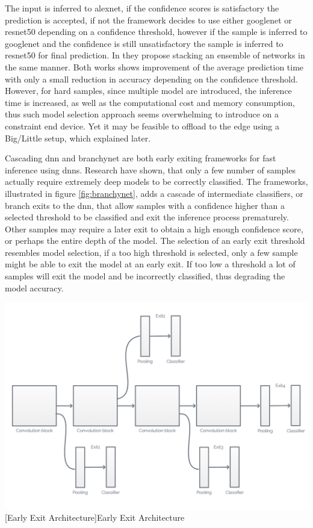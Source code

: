 \begin{enumdescript}
	The input is inferred to \gls{alexnet}, if the confidence scores is satisfactory the prediction is accepted, if not the framework decides to use either \gls{googlenet} or \gls{resnet}50 depending on a confidence threshold, however if the sample is inferred to \gls{googlenet} and the confidence is still unsatisfactory the sample is inferred to \gls{resnet}50 for final prediction. In \cite{tann_flexible_2018} they propose stacking an ensemble of networks in the same manner. Both works shows improvement of the average prediction time with only a small reduction in accuracy depending on the confidence threshold. However, for hard samples, since multiple model are introduced, the inference time is increased, as well as the computational cost and memory consumption, thus such model selection approach seems overwhelming to introduce on a constraint end device. Yet it may be feasible to offload to the edge using a Big/Little setup, which explained later.
	
	\item[Model Early Exit] Cascading \gls{dnn} \cite{leroux_resource-constrained_2015} and \gls{branchynet} \cite{teerapittayanon_branchynet:_2016} are both early exiting frameworks for fast inference using \gls{dnn}s. Research have shown, that only a few number of samples actually require extremely deep models to be correctly classified. The frameworks, illustrated in figure \ref{fig:branchynet}, adds a cascade of intermediate classifiers, or branch exits to the \gls{dnn}, that allow samples with a confidence higher than a selected threshold to be classified and exit the inference process prematurely. Other samples may require a later exit to obtain a high enough confidence score, or perhaps the entire depth of the model. The selection of an early exit threshold resembles model selection, if a too high threshold is selected, only a few sample might be able to exit the model at an early exit. If too low a threshold a lot of samples will exit the model and be incorrectly classified, thus degrading the model accuracy. 

	\begin{minipage}[t]{\linewidth}    
		\centering                          
		\includegraphics[width=.7\linewidth]{figures/models/branchy}
		[Early Exit Architecture]{Early Exit Architecture}
		\label{fig:branchynet}
	\end{minipage}


\end{enumdescript}

